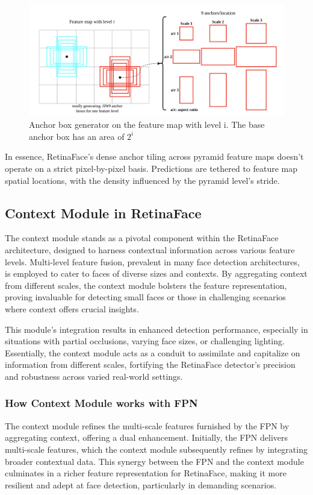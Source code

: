 \documentclass{article}
\begin{document}
\begin{figure}[h]
  \centering
  \includegraphics[width=0.7\linewidth]{images/anochor_tiling_2}
  \caption{Anchor box generator on the feature map with level i. The base anchor box has an area of $2^i$}
  \label{fig:anochor_tiling_2}
\end{figure}

In essence, RetinaFace's dense anchor tiling across pyramid feature maps doesn't operate on a strict pixel-by-pixel basis. Predictions are tethered to feature map spatial locations, with the density influenced by the pyramid level's stride.

\subsection{Context Module in RetinaFace}

The context module stands as a pivotal component within the RetinaFace architecture, designed to harness contextual information across various feature levels. Multi-level feature fusion, prevalent in many face detection architectures, is employed to cater to faces of diverse sizes and contexts. By aggregating context from different scales, the context module bolsters the feature representation, proving invaluable for detecting small faces or those in challenging scenarios where context offers crucial insights.

This module's integration results in enhanced detection performance, especially in situations with partial occlusions, varying face sizes, or challenging lighting. Essentially, the context module acts as a conduit to assimilate and capitalize on information from different scales, fortifying the RetinaFace detector's precision and robustness across varied real-world settings.

\subsubsection{How Context Module works with FPN}

The context module refines the multi-scale features furnished by the FPN by aggregating context, offering a dual enhancement. Initially, the FPN delivers multi-scale features, which the context module subsequently refines by integrating broader contextual data. This synergy between the FPN and the context module culminates in a richer feature representation for RetinaFace, making it more resilient and adept at face detection, particularly in demanding scenarios.
\end{document}
